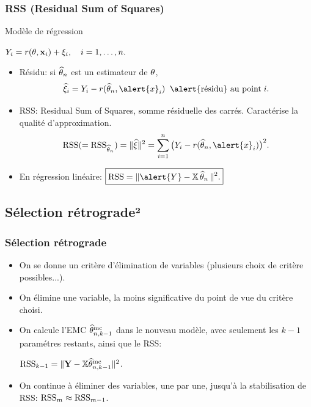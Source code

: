 \begin{frame}
\frametitle{RSS (Residual Sum of Squares)} Modèle de
régression\vspace{2mm} \centerline{$ Y_i= r(\theta, {\bf
x}_i)+\xi_i, \quad i=1,\dots,n.$}
\begin{itemize}
\item \alert{Résidu:} si $\operatorname{\widehat \theta_{\mathnormal{n}}}$ est un estimateur de
$\theta$,
$$\widehat \xi_i = Y_i - r(\est, \alert{x}_i)
\;\;\text{\alert{résidu} au point}\;i.$$
\item \alert{RSS:} \alert{ Residual Sum of Squares}, somme
résiduelle des carrés. Caractérise la qualité
d'approximation.
$${\rm RSS}(={\rm RSS}_{\est})=\|\widehat \xi\|^2
= \sum_{i = 1}^n\big(Y_i - r(\est,\alert{x}_i)\big)^2.$$
\item En régression \alert{linéaire}:
$\boxed{{\rm RSS}= \|\alert{Y}-\regressmat\est\|^2.}$
\end{itemize}
\end{frame}

\subsection{Sélection rétrograde²}

\begin{frame}
\frametitle{Sélection rétrograde}
\begin{itemize}
\item On se donne un critère d'élimination de variables
\alert{(plusieurs choix de critère possibles...)}.
\item On élimine une
variable, la moins significative du point de vue du critère
choisi.
\item On calcule l'EMC $\widehat{\theta}_{n,k-1}^{\rm mc}$ dans le nouveau modèle, avec seulement
les $k-1$ paramétres restants, ainsi que le RSS:\vspace{1mm}
\centerline{${\rm RSS}_{k-1}=\|{\bf
Y}-\mathbb{X}\widehat{\theta}_{n,k-1}^{\rm mc}\|^2$.}\vspace{1mm}
\item On continue \`a éliminer des variables, une par une,
jusqu'\`a la \alert{stabilisation de RSS}: ${\rm
RSS}_{m}\approx {\rm RSS}_{m-1}$.
\end{itemize}
\end{frame}


